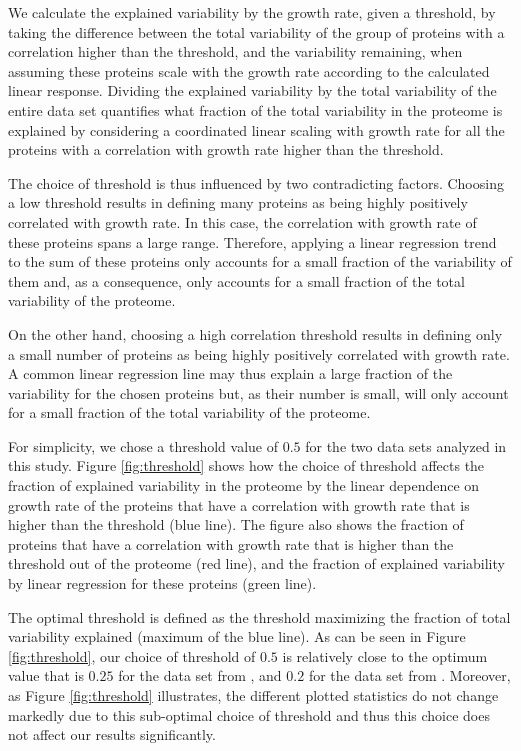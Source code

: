 \documentclass{article}
\begin{document}
We calculate the explained variability by the growth rate, given a threshold, by taking the difference between the total variability of the group of proteins with a correlation higher than the threshold, and the variability remaining, when assuming these proteins scale with the growth rate according to the calculated linear response.
Dividing the explained variability by the total variability of the entire data set quantifies what fraction of the total variability in the proteome is explained by considering a coordinated linear scaling with growth rate for all the proteins with a correlation with growth rate higher than the threshold.

The choice of threshold is thus influenced by two contradicting factors.
Choosing a low threshold results in defining many proteins as being highly positively correlated with growth rate.
In this case, the correlation with growth rate of these proteins spans a large range.
Therefore, applying a linear regression trend to the sum of these proteins only accounts for a small fraction of the variability of them and, as a consequence, only accounts for a small fraction of the total variability of the proteome.

On the other hand, choosing a high correlation threshold results in defining only a small number of proteins as being highly positively correlated with growth rate.
A common linear regression line may thus explain a large fraction of the variability for the chosen proteins but, as their number is small, will only account for a small fraction of the total variability of the proteome.

For simplicity, we chose a threshold value of $0.5$ for the two data sets analyzed in this study.
Figure \ref{fig:threshold} shows how the choice of threshold affects the fraction of explained variability in the proteome by the linear dependence on growth rate of the proteins that have a correlation with growth rate that is higher than the threshold (blue line).
The figure also shows the fraction of proteins that have a correlation with growth rate that is higher than the threshold out of the proteome (red line), and the fraction of explained variability by linear regression for these proteins (green line).

The optimal threshold is defined as the threshold maximizing the fraction of total variability explained (maximum of the blue line).
As can be seen in Figure \ref{fig:threshold}, our choice of threshold of $0.5$ is relatively close to the optimum value that is $0.25$ for the data set from \cite{Schmidt2015}, and $0.2$ for the data set from \cite{Peebo_2015}.
Moreover, as Figure \ref{fig:threshold} illustrates, the different plotted statistics do not change markedly due to this sub-optimal choice of threshold and thus this choice does not affect our results significantly.
\end{document}
